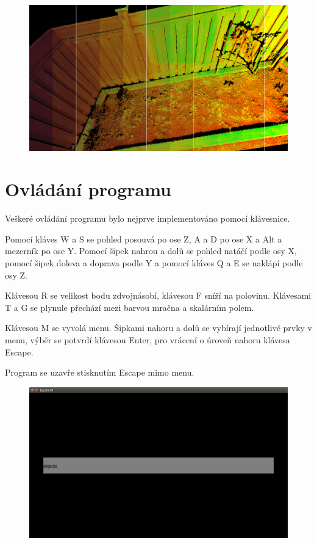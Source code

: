\begin{figure}
	\centering
	\includegraphics[keepaspectratio,width=\textwidth]{obrazky/skalar}
	\label{skalar}
\end{figure}

\FloatBarrier

\section{Ovládání programu}

Veškeré ovládání programu bylo nejprve implementováno pomocí klávesnice.

Pomocí kláves W a S se pohled posouvá po ose Z, A a D po ose X a Alt a mezerník po ose Y. Pomocí šipek nahrou a dolů se pohled natáčí podle osy X, pomocí šipek doleva a doprava podle Y a pomocí kláves Q a E se naklápí podle osy Z.

Klávesou R se velikost bodu zdvojnásobí, klávesou F sníží na polovinu. Klávesami T a G se plynule přechází mezi barvou mračna a skalárním polem.

Klávesou M se vyvolá menu. Šipkami nahoru a dolů se vybírají jednotlivé prvky v menu, výběr se potvrdí klávesou Enter, pro vrácení o úroveň nahoru klávesa Escape.

Program se uzavře stisknutím Escape mimo menu.

\begin{figure}
	\centering
	\includegraphics[keepaspectratio,width=\textwidth]{obrazky/objects}
	\label{hlavni-menu}
\end{figure}

